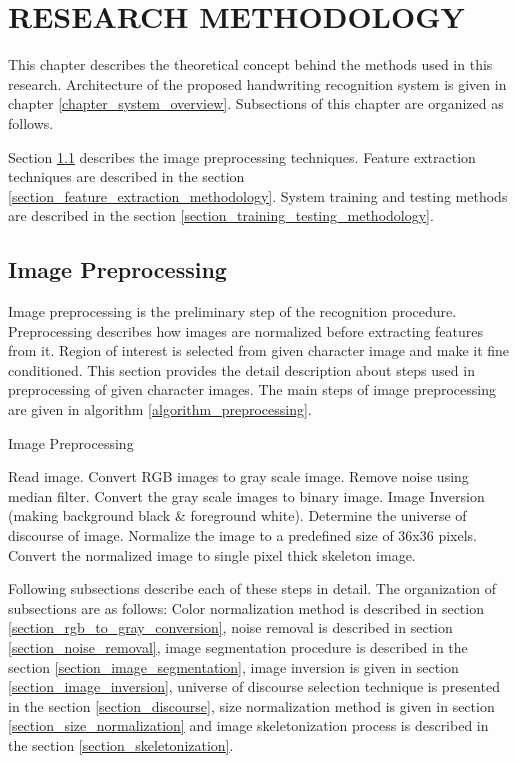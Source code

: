 \chapter{RESEARCH METHODOLOGY}
\label{chapter_research_methodology}
This chapter describes the theoretical concept behind the methods used in this research. Architecture of the proposed handwriting recognition system is given in chapter \ref{chapter_system_overview}. Subsections of this chapter are organized as follows.\par
Section \ref{section_preprocessing_methodology} describes the image preprocessing techniques. Feature extraction techniques are described in the section \ref{section_feature_extraction_methodology}. System training and testing methods are described in the section \ref{section_training_testing_methodology}.

\section{Image Preprocessing}\label{section_preprocessing_methodology}

Image preprocessing is the preliminary step of the recognition procedure. Preprocessing describes how images are normalized before extracting features from it. Region of interest is selected from given character image and make it fine conditioned. This section provides the detail description about steps used in preprocessing of given character images. The main steps of image preprocessing are given in algorithm \ref{algorithm_preprocessing}.

\begin{algorithm}
\caption{Image Preprocessing}
\label{algorithm_preprocessing}
\begin{algorithmic}[1]
\STATE  Read image.
\STATE  Convert RGB images to gray scale image.
\STATE  Remove noise using median filter.
\STATE  Convert the gray scale images to binary image.
\STATE	Image Inversion (making background black \& foreground white).
\STATE  Determine the universe of discourse of image.
\STATE  Normalize the image to a predefined size of 36x36 pixels.
\STATE  Convert the normalized image to single pixel thick skeleton image.
\end{algorithmic}
\end{algorithm}

Following subsections describe each of these steps in detail. The organization of subsections are as follows: Color normalization method is described in section \ref{section_rgb_to_gray_conversion}, noise removal is described in section \ref{section_noise_removal}, image segmentation procedure is described in the section \ref{section_image_segmentation}, image inversion is given in section \ref{section_image_inversion}, universe of discourse selection technique is presented in the section \ref{section_discourse}, size normalization method is given in section \ref{section_size_normalization} and image skeletonization process is described in the section \ref{section_skeletonization}.


